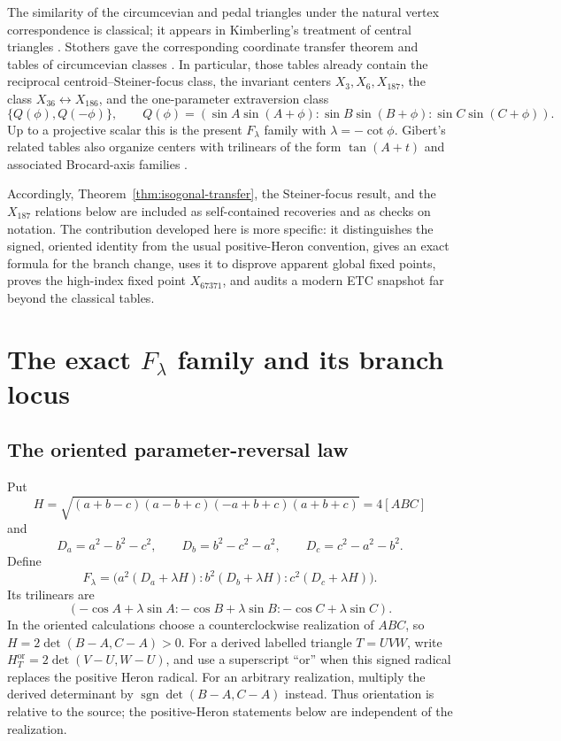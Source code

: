 \documentclass[11pt]{article}
\begin{document}
The similarity of the circumcevian and pedal triangles under the natural
vertex correspondence is classical; it appears in Kimberling's treatment of
central triangles \cite{Kimberling1998}.  Stothers gave the corresponding
coordinate transfer theorem and tables of circumcevian classes
\cite{StothersPedal,StothersCircum}.  In particular, those tables already
contain the reciprocal centroid--Steiner-focus class, the invariant centers
$X_3,X_6,X_{187}$, the class $X_{36}\leftrightarrow X_{186}$, and the
one-parameter extraversion class
\[
 \{Q(\phi),Q(-\phi)\},\qquad
 Q(\phi)=(\sin A\sin(A+\phi):\sin B\sin(B+\phi):
 \sin C\sin(C+\phi)).
\]
Up to a projective scalar this is the present $F_\lambda$ family with
$\lambda=-\cot\phi$.  Gibert's related tables also organize centers with
trilinears of the form $\tan(A+t)$ and associated Brocard-axis families
\cite{GibertTable38}.

Accordingly, Theorem~\ref{thm:isogonal-transfer}, the Steiner-focus result,
and the $X_{187}$ relations below are included as self-contained recoveries
and as checks on notation.  The contribution developed here is more
specific: it distinguishes the signed, oriented identity from the usual
positive-Heron convention, gives an exact formula for the branch change,
uses it to disprove apparent global fixed points, proves the high-index fixed
point $X_{67371}$, and audits a modern ETC snapshot far beyond the classical
tables.

\section{\texorpdfstring{The exact $F_\lambda$ family and its branch locus}
{The exact F-lambda family and its branch locus}}
\label{sec:families}

\subsection{The oriented parameter-reversal law}

Put
\[
 H=\sqrt{(a+b-c)(a-b+c)(-a+b+c)(a+b+c)}=4[ABC]
\]
and
\[
 D_a=a^2-b^2-c^2,\qquad D_b=b^2-c^2-a^2,\qquad
 D_c=c^2-a^2-b^2.
\]
Define
\begin{equation}\label{eq:F-lambda}
 F_\lambda=
 \bigl(a^2(D_a+\lambda H):b^2(D_b+\lambda H):
 c^2(D_c+\lambda H)\bigr).
\end{equation}
Its trilinears are
\[
 (-\cos A+\lambda\sin A:-\cos B+\lambda\sin B:
 -\cos C+\lambda\sin C).
\]
In the oriented calculations choose a counterclockwise realization of
$ABC$, so $H=2\det(B-A,C-A)>0$.  For a derived labelled triangle $T=UVW$,
write $H_T^{\mathrm{or}}=2\det(V-U,W-U)$, and use a superscript ``or''
when this signed radical replaces the positive Heron radical.
For an arbitrary realization, multiply the derived determinant by
$\operatorname{sgn}\det(B-A,C-A)$ instead.  Thus orientation is relative
to the source; the positive-Heron statements below are independent of
the realization.
\end{document}
